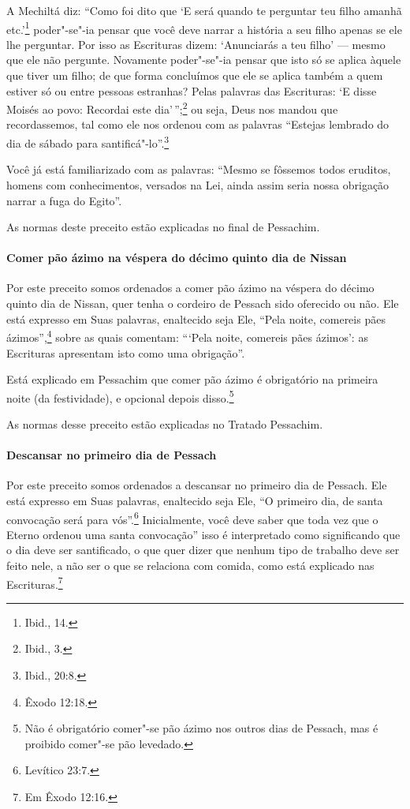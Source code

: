 \begin{multicols}{2}
A Mechiltá\starr{} diz: ``Como foi dito que `E será quando te perguntar teu
filho amanhã etc.'\footnote{Ibid., 14.} poder"-se"-ia pensar que você deve narrar a
história a seu filho apenas se ele lhe perguntar. Por isso as Escrituras
dizem: `Anunciarás a teu filho' --- mesmo que ele não pergunte.
Novamente poder"-se"-ia pensar que isto só se aplica àquele que tiver um
filho; de que forma concluímos que ele se aplica também a quem estiver
só ou entre pessoas estranhas? Pelas palavras das Escrituras: `E disse
Moisés ao povo: Recordai este dia'\,'';\footnote{Ibid., 3.} ou seja, Deus nos
mandou que recordassemos, tal como ele nos ordenou com as palavras
``Estejas lembrado do dia de sábado para santificá"-lo''.\footnote{Ibid., 20:8.}

Você já está familiarizado com as palavras: ``Mesmo se fôssemos todos
eruditos, homens com conhecimentos, versados na Lei, ainda assim seria
nossa obrigação narrar a fuga do Egito''.

As normas deste preceito estão explicadas no final de Pessachim\starr.

\paragraph{Comer pão ázimo na véspera do décimo quinto dia de Nissan\starr}

Por este preceito somos ordenados a comer pão ázimo na véspera do décimo
quinto dia de Nissan\starr, quer tenha o cordeiro de Pessach\starr{} sido oferecido ou não. Ele está expresso em Suas palavras, enaltecido seja Ele,
``Pela noite, comereis pães ázimos'',\footnote{Êxodo 12:18.} sobre as quais
comentam: ```Pela noite, comereis pães ázimos': as Escrituras apresentam
isto como uma obrigação''.

Está explicado em Pessachim\starr{} que comer pão ázimo é obrigatório na primeira
noite (da festividade), e opcional depois disso.\footnote{Não é obrigatório comer"-se pão ázimo nos outros dias de Pessach\starr, mas é proibido comer"-se pão levedado.}

As normas desse preceito estão explicadas no Tratado Pessachim\starr.

\paragraph{Descansar no primeiro dia de Pessach\starr{}}

Por este preceito somos ordenados a descansar no primeiro dia de
Pessach\starr. Ele está expresso em Suas palavras, enaltecido seja Ele, ``O
primeiro dia, de santa convocação será para vós''.\footnote{Levítico 23:7.}
Inicialmente, você deve saber que toda vez que o Eterno ordenou uma
santa convocação'' isso é interpretado como significando que o dia deve ser santificado, o que quer dizer que nenhum tipo de trabalho deve ser feito nele, a não ser o que se relaciona com comida, como está explicado nas Escrituras.\footnote{Em Êxodo 12:16.}


\end{multicols}
